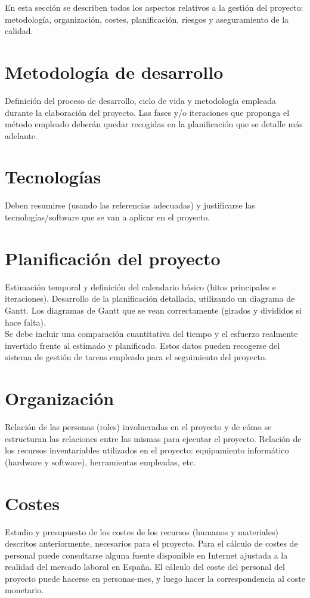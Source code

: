 En esta sección se describen todos los aspectos relativos a la gestión del proyecto: metodología, organización, costes, planificación, riesgos y aseguramiento de la calidad.

\section{Metodología de desarrollo}
Definición del proceso de desarrollo, ciclo de vida y metodología empleada durante la elaboración del proyecto. Las fases y/o iteraciones que proponga el método empleado deberán quedar recogidas en la planificación que se detalle más adelante.

\section{Tecnologías}

Deben resumirse (usando las referencias adecuadas) y justificarse las tecnologías/software que se van a aplicar en el proyecto.



\section{Planificación del proyecto}
Estimación temporal y definición del calendario básico (hitos principales e iteraciones). Desarrollo de la planificación detallada, utilizando un diagrama de Gantt. Los diagramas de Gantt que se vean correctamente (girados y divididos si hace falta).\\

Se debe incluir una comparación cuantitativa del tiempo y el esfuerzo realmente invertido frente al estimado y planificado. Estos datos pueden recogerse del sistema de gestión de tareas empleado para el seguimiento del proyecto.

\section{Organización}
Relación de las personas (roles) involucradas en el proyecto y de cómo se estructuran las relaciones entre las mismas para ejecutar el proyecto. Relación de los recursos inventariables utilizados en el proyecto: equipamiento informático (hardware y software), herramientas empleadas, etc. \\

\section{Costes}
Estudio y presupuesto de los costes de los recursos (humanos y materiales) descritos anteriormente, necesarios para el proyecto. Para el cálculo de costes de personal puede consultarse alguna fuente disponible en Internet ajustada a la realidad del mercado laboral en España. El cálculo del coste del personal del proyecto puede hacerse en personas-mes, y luego hacer la correspondencia al coste monetario.\\

